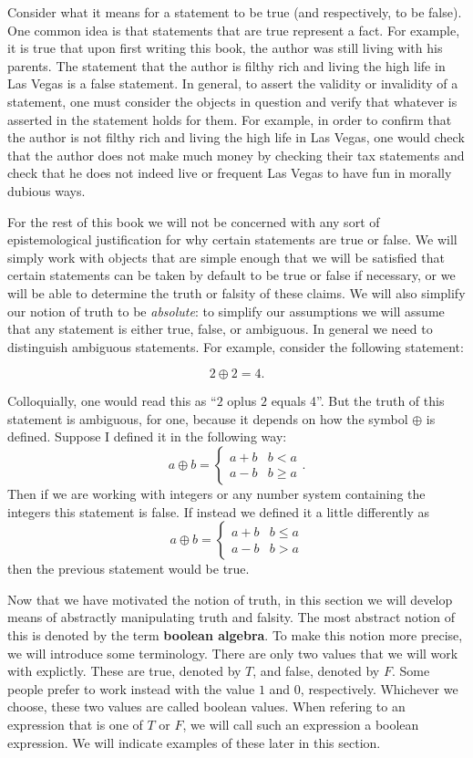 Consider what it means for a statement to be true (and respectively, to be false). One common idea is that statements that are true represent a fact. For example, it is true that upon first writing this book, the author was still living with his parents. The statement that the author is filthy rich and living the high life in Las Vegas is a false statement. In general, to assert the validity or invalidity of a statement, one must consider the objects in question and verify that whatever is asserted in the statement holds for them. For example, in order to confirm that the author is not filthy rich and living the high life in Las Vegas, one would check that the author does not make much money by checking their tax statements and check that he does not indeed live or frequent Las Vegas to have fun in morally dubious ways.

For the rest of this book we will not be concerned with any sort of epistemological justification for why certain statements are true or false. We will simply work with objects that are simple enough that we will be satisfied that certain statements can be taken by default to be true or false if necessary, or we will be able to determine the truth or falsity of these claims. We will also simplify our notion of truth to be \textit{absolute}: to simplify our assumptions we will assume that any statement is either true, false, or ambiguous. In general we need to distinguish ambiguous statements. For example, consider the following statement:

\[2 \oplus 2 = 4.\]

Colloquially, one would read this as ``$2$ oplus $2$ equals 4''. But the truth of this statement is ambiguous, for one, because it depends on how the symbol $\oplus$ is defined. Suppose I defined it in the following way:
\[a \oplus b = \begin{cases} a + b & b < a \\ a - b &b \geq a\end{cases}.\]
Then if we are working with integers or any number system containing the integers this statement is false. If instead we defined it a little differently as
\[a \oplus b = \begin{cases} a + b & b \leq a \\ a - b & b > a\end{cases}\]
then the previous statement would be true.

Now that we have motivated the notion of truth, in this section we will develop means of abstractly manipulating truth and falsity. The most abstract notion of this is denoted by the term \textbf{boolean algebra}. To make this notion more precise, we will introduce some terminology. There are only two values that we will work with explictly. These are true, denoted by $T$, and false, denoted by $F$. Some people prefer to work instead with the value $1$ and $0$, respectively. Whichever we choose, these two values are called boolean values. When refering to an expression that is one of $T$ or $F$, we will call such an expression a boolean expression. We will indicate examples of these later in this section.


